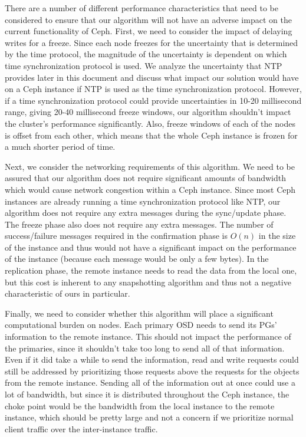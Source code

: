There are a number of different performance characteristics that need
to be considered to ensure that our algorithm will not have an adverse
impact on the current functionality of Ceph. First, we need to
consider the impact of delaying writes for a freeze. Since each node
freezes for the uncertainty that is determined by the time protocol,
the magnitude of the uncertainty is dependent on which time
synchronization protocol is used. We analyze the uncertainty that NTP
provides later in this document and discuss what impact our solution
would have on a Ceph instance if NTP is used as the time
synchronization protocol. However, if a time synchronization protocol
could provide uncertainties in 10-20 millisecond range, giving 20-40
millisecond freeze windows, our algorithm shouldn’t impact the
cluster’s performance significantly. Also, freeze windows of each of
the nodes is offset from each other, which means that the whole Ceph
instance is frozen for a much shorter period of time.

Next, we consider the networking requirements of this algorithm. We
need to be assured that our algorithm does not require significant
amounts of bandwidth which would cause network congestion within a
Ceph instance. Since most Ceph instances are already running a time
synchronization protocol like NTP, our algorithm does not require any
extra messages during the sync/update phase. The freeze phase also
does not require any extra messages. The number of success/failure
messages required in the confirmation phase is $O(n)$ in the size of
the instance and thus would not have a significant impact on the
performance of the instance (because each message would be only a few
bytes). In the replication phase, the remote instance needs to read
the data from the local one, but this cost is inherent to any
snapshotting algorithm and thus not a negative characteristic of ours
in particular.

Finally, we need to consider whether this algorithm will place a
significant computational burden on nodes. Each primary OSD needs to
send its PGs' information to the remote instance. This should not
impact the performance of the primaries, since it shouldn’t take too
long to send all of that information. Even if it did take a while to
send the information, read and write requests could still be addressed
by prioritizing those requests above the requests for the objects from
the remote instance. Sending all of the information out at once could
use a lot of bandwidth, but since it is distributed throughout the
Ceph instance, the choke point would be the bandwidth from the local
instance to the remote instance, which should be pretty large and not
a concern if we prioritize normal client traffic over the
inter-instance traffic.

